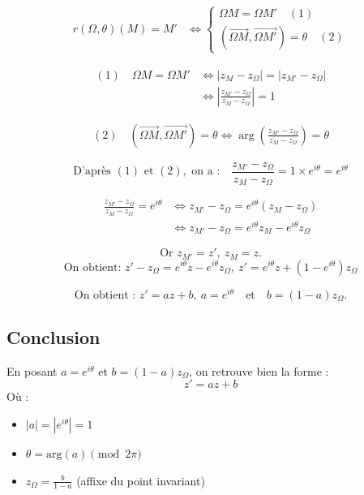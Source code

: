 \documentclass[12pt,a4paper]{article}
\begin{document}
            $$
                \begin{aligned}
                r(\Omega, \theta)(M) = M' &\iff
                \begin{cases}
                \Omega M = \Omega M' \quad (1)\\
                (\overrightarrow{\Omega M},\overrightarrow{\Omega M'}) = \theta \quad (2)
                \end{cases}
                \end{aligned}
                $$
            

            $$
                \begin{aligned}
                (1)\quad \Omega M = \Omega M' &\iff |z_M - z_{\Omega}| = |z_{M'} - z_{\Omega}|\\
                &\iff \left| \frac{z_{M'} - z_{\Omega}}{z_M - z_{\Omega}} \right| = 1
                \end{aligned}
                $$
            

            $$
                \begin{aligned}
                (2)\quad (\overrightarrow{\Omega M}, \overrightarrow{\Omega M'}) = \theta \iff \arg\left( \frac{z_{M'} -
                z_{\Omega}}{z_M - z_{\Omega}} \right) = \theta
                \end{aligned}
                $$

            $$\text{D'après } (1) \text{ et } (2), \text{ on a :} \quad \frac{z_{M'} - z_{\Omega}}{z_M - z_{\Omega}}
                = 1
                \times e^{i\theta} = e^{i\theta}$$

            $$
                \begin{aligned}
                \frac{z_{M'} - z_{\Omega}}{z_M - z_{\Omega}} = e^{i\theta} &\iff z_{M'} - z_{\Omega} = e^{i\theta}(z_M -
                z_{\Omega})\\
                &\iff z_{M'} - z_{\Omega} = e^{i\theta} z_M - e^{i\theta} z_{\Omega}
                \end{aligned}
                $$

            $$\text{Or } z_{M'} = z', \ z_M = z.$$ $$\text{On obtient: } z' - z_{\Omega} = e^{i\theta} z -
                e^{i\theta}
                z_{\Omega}, \ z' = e^{i\theta} z + (1 - e^{i\theta}) z_{\Omega}$$

            $$\text{On obtient : } z' = az + b, \ a = e^{i\theta} \quad \text{et} \quad b = (1 - a) z_{\Omega}.$$

\subsection*{Conclusion}
En posant $a = e^{i\theta}$ et $b = (1 - a) z_{\Omega}$, on retrouve bien la forme :
\[ z' = az + b \]
Où :
\begin{itemize}
    \item $|a| = |e^{i\theta}| = 1$
    \item $\theta = \text{arg}(a) \pmod{2\pi}$
    \item $z_{\Omega} = \frac{b}{1 - a}$ (affixe du point invariant)
\end{itemize}
\end{document}
